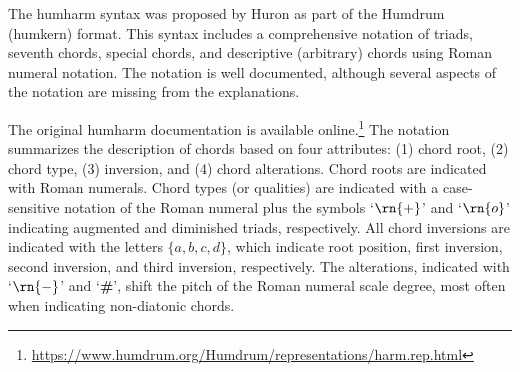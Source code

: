 

The \gls{humharm} syntax was proposed by Huron as part of
the Humdrum (\gls{humkern}) format. This syntax includes a
comprehensive notation of triads, seventh chords, special
chords, and descriptive (arbitrary) chords using Roman
numeral notation. The notation is well documented, although
several aspects of the notation are missing from the
explanations.

The original \gls{humharm} documentation is available
online.\footnote{\href{https://www.humdrum.org/Humdrum/representations/harm.rep.html}{https://www.humdrum.org/Humdrum/representations/harm.rep.html}}
The notation summarizes the description of chords based on
four attributes: (1) chord root, (2) chord type, (3)
inversion, and (4) chord alterations. Chord roots are
indicated with Roman numerals. Chord types (or qualities)
are indicated with a case-sensitive notation of the Roman
numeral plus the symbols `$\rn{+}$' and `$\rn{o}$'
indicating augmented and diminished triads, respectively.
All chord inversions are indicated with the letters $\{a, b,
c, d\}$, which indicate root position, first inversion,
second inversion, and third inversion, respectively. The
alterations, indicated with `$\rn{-}$' and `\textbf{\#}',
shift the pitch of the Roman numeral scale degree, most
often when indicating non-diatonic chords.
